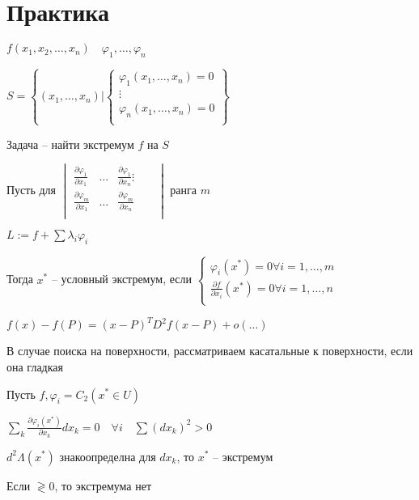 \documentclass{book}
\theoremstyle{definition}
\begin{document}
    \section{Практика}

    $f(x_1, x_2, \ldots, x_{n} )\quad \varphi_1, \ldots, \varphi_n$

    $S = \left\{ \left( x_1, \ldots, x_{n}  \right) | \begin{cases}
            \varphi_1(x_1, \ldots, x_{n} ) = 0\\
            \vdots\\
            \varphi_n(x_1, \ldots, x_{n} ) = 0\\
    \end{cases} \right\} $ 

    Задача -- найти экстремум $f$ на  $S$

     \begin{theorem}

         Пусть для $
         \begin{vmatrix}
             \frac{\partial \varphi_1}{\partial x_1}& \ldots & \frac{\partial \varphi_1}{\partial x_{n}}
                 \vdots&&\\
                 \frac{\partial \varphi_m}{\partial x_1} & \ldots & \frac{\partial \varphi_m}{\partial x_{n} }\\
         \end{vmatrix}$ ранга $m$ 

         $L :=f + \sum \lambda_i \varphi_i$

         Тогда  $x^*$ -- условный экстремум, если  $\begin{cases}
             \varphi_i(x^*) = 0 \forall i = 1, \ldots, m\\
             \frac{\partial f}{\partial x_i}(x^*) = 0 \forall i = 1, \ldots, n\\
         \end{cases}$
\end{theorem}

$f(x) - f(P) = (x-P)^TD^2f(x-P) + o\left( \ldots \right) $ 

В случае поиска на поверхности, рассматриваем касатальные к поверхности, если она гладкая

\begin{theorem}

    Пусть $f, \varphi_i = C_2(x^*\in U)$

    $\sum\limits_k \frac{\partial \varphi_i(x^*)}{\partial x_k}dx_k = 0\quad \forall i\quad \sum (dx_k)^2 >0$

    $d^2\Lambda(x^*)$ знакоопределна для  $dx_k$, то  $x^*$ -- экстремум

    Если  $\gtrless 0$, то экстремума нет
\end{theorem}
\end{document}
